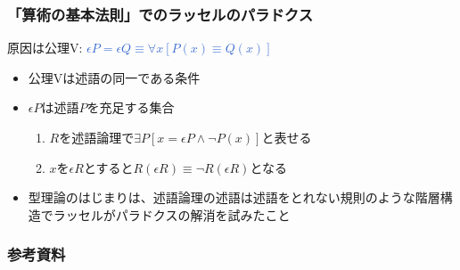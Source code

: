 \documentclass[unicode, 14pt, aspectratio=169]{beamer}
\begin{document}
\begin{frame}
  \frametitle{「算術の基本法則」でのラッセルのパラドクス}
  {\large 原因は公理V: \textcolor{highlight}{$\epsilon P=\epsilon Q \equiv \forall x [P(x)\equiv Q(x)]$}}
  \begin{itemize}
  \item 公理Vは述語の同一である条件
  \item $\epsilon P$は述語$P$を充足する集合 
    \begin{enumerate}
    \item $R$を述語論理で$\exists P[x=\epsilon P\wedge \neg P(x)]$と表せる
    \item $x$を$\epsilon R$とすると$R(\epsilon R)\equiv\neg R(\epsilon R)$となる
    \end{enumerate}
  \item 型理論のはじまりは、述語論理の述語は述語をとれない規則のような階層構造でラッセルがパラドクスの解消を試みたこと
  \end{itemize}
\end{frame}
\begin{frame}[allowframebreaks,t]
  \frametitle{参考資料}
  \printbibliography
  \nocite{*}
\end{frame}
\end{document}
